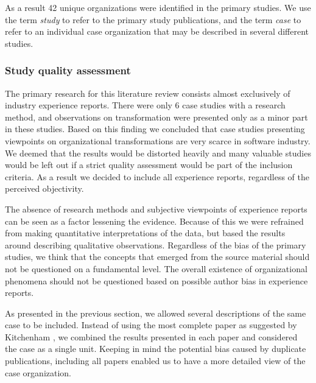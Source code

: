\documentclass[preprint,authoryear,12pt]{elsarticle}
\begin{document}
As a result 42 unique organizations were identified in the primary studies. We
use the term \emph{study} to refer to the primary study publications, and the
term \emph{case} to refer to an individual case organization that may be
described in several different studies.


\subsubsection{Study quality assessment}

The primary research for this literature review consists almost exclusively of
industry experience reports. There were only 6 case studies with a research
method, and observations on transformation were presented only as a minor part
in these studies. Based on this finding we concluded that case studies
presenting viewpoints on organizational transformations are very scarce in
software industry. We deemed that the results would be distorted heavily and
many valuable studies would be left out if a strict quality assessment would be
part of the inclusion criteria. As a result we decided to include all experience
reports, regardless of the perceived objectivity.

The absence of research methods and subjective viewpoints of experience reports
can be seen as a factor lessening the evidence. Because of this we were
refrained from making quantitative interpretations of the data, but based the
results around describing qualitative observations. Regardless of the bias of
the primary studies, we think that the concepts that emerged from the source
material should not be questioned on a fundamental level. The overall existence
of organizational phenomena should not be questioned based on possible author
bias in experience reports.



% 

As presented in the previous section, we allowed several descriptions of the
same case to be included. Instead of using the most complete paper as suggested
by Kitchenham \cite{Kitchenham2007}, we combined the results presented in each
paper and considered the case as a single unit. Keeping in mind the potential
bias caused by duplicate publications, including all papers enabled us to have a
more detailed view of the case organization.
\end{document}
